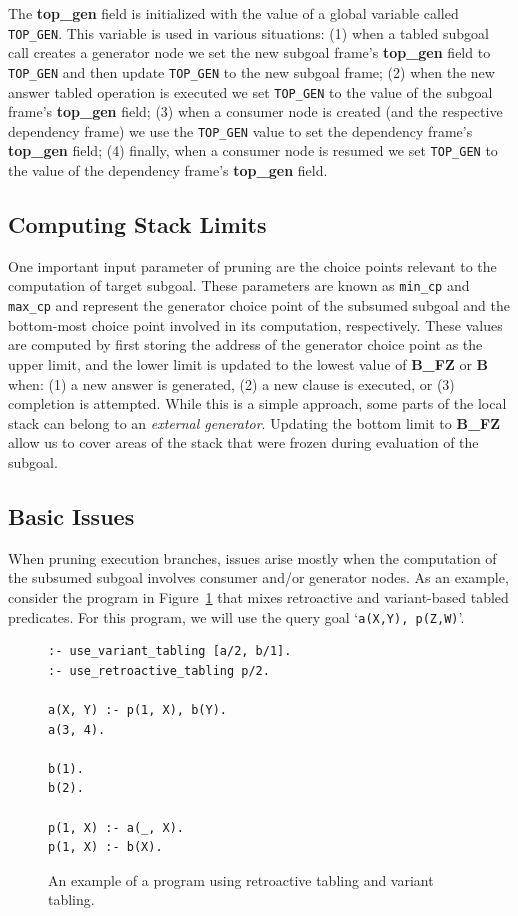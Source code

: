The \textbf{top\_gen} field is initialized with the value
of a global variable called \texttt{TOP\_GEN}. This variable is used in various
situations: (1) when a tabled subgoal call creates a generator node we set the
new subgoal frame's \textbf{top\_gen} field to \texttt{TOP\_GEN} and then update
\texttt{TOP\_GEN} to the new subgoal frame; (2) when the new answer tabled operation
is executed we set \texttt{TOP\_GEN} to the value of the subgoal frame's \textbf{top\_gen}
field; (3) when a consumer node is created (and the respective dependency frame) we
use the \texttt{TOP\_GEN} value to set the dependency frame's \textbf{top\_gen} field;
(4) finally, when a consumer node is resumed we set \texttt{TOP\_GEN} to the value
of the dependency frame's \textbf{top\_gen} field.

\subsection{Computing Stack Limits}

One important input parameter of pruning are the choice points relevant to the
computation of target subgoal. These parameters are known as \texttt{min\_cp} and \texttt{max\_cp} and
represent the generator choice point of the subsumed subgoal and the bottom-most choice point
involved in its computation, respectively. These values are computed by first storing the address
of the generator choice point as the upper limit, and the lower limit is updated to the lowest value of
\textbf{B\_FZ} or \textbf{B} when: (1) a new answer is generated, (2) a new clause is executed, or (3)
completion is attempted. While this is a simple approach, some parts of the local stack can belong to an
\textit{external generator}. Updating the bottom limit to \textbf{B\_FZ} allow us to cover areas of
the stack that were frozen during evaluation of the subgoal.

\subsection{Basic Issues}

When pruning execution branches, issues arise mostly when the computation of the subsumed subgoal
involves consumer and/or generator nodes. As an example, consider the program in Figure~\ref{fig:retro_program2}
that mixes retroactive and variant-based tabled predicates. For this program, we will use the query goal
`\texttt{a(X,Y),~p(Z,W)}'.

\begin{figure}[ht]
\begin{Verbatim}
:- use_variant_tabling [a/2, b/1].
:- use_retroactive_tabling p/2.

a(X, Y) :- p(1, X), b(Y).
a(3, 4).

b(1).
b(2).

p(1, X) :- a(_, X).
p(1, X) :- b(X).
\end{Verbatim}
\caption{An example of a program using retroactive tabling and variant tabling.}
\label{fig:retro_program2}
\end{figure}

